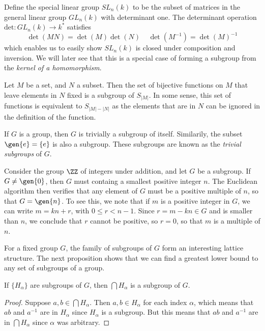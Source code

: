 \begin{example}
    Define the special linear group $SL_n(k)$ to be the subset of matrices in the general linear group $GL_n(k)$ with determinant one. The determinant operation $\text{det}: GL_n(k) \to k^*$ satisfies
    \[ \det(MN) = \det(M) \det(N)\ \ \ \ \ \det(M^{-1}) = \det(M)^{-1} \]
    which enables us to easily show $SL_n(k)$ is closed under composition and inversion. We will later see that this is a special case of forming a subgroup from the {\it kernel of a homomorphism}.
\end{example}

\begin{example}
    Let $M$ be a set, and $N$ a subset. Then the set of bijective functions on $M$ that leave elements in $N$ fixed is a subgroup of $S_{|M|}$. In some sense, this set of functions is equivalent to $S_{|M| - |N|}$ as the elements that are in $N$ can be ignored in the definition of the function.
\end{example}

\begin{example}
    If $G$ is a group, then $G$ is trivially a subgroup of itself. Similarily, the subset $\gen{e} = \{ e \}$ is also a subgroup. These subgroups are known as the \emph{trivial subgroups} of $G$.
\end{example}

\begin{example}
    Consider the group $\ZZ$ of integers under addition, and let $G$ be a subgroup. If $G \neq \gen{0}$, then $G$ must containg a smallest positive integer $n$. The Euclidean algorithm then verifies that any element of $G$ must be a positive multiple of $n$, so that $G = \gen{n}$. To see this, we note that if $m$ is a positive integer in $G$, we can write $m = kn + r$, with $0 \leq r < n-1$. Since $r = m - kn \in G$ and is smaller than $n$, we conclude that $r$ cannot be positive, so $r = 0$, so that $m$ is a multiple of $n$.
\end{example}

For a fixed group $G$, the family of subgroups of $G$ form an interesting lattice structure. The next proposition shows that we can find a greatest lower bound to any set of subgroups of a group.

\begin{prop}
    If $\{ H_\alpha \}$ are subgroups of $G$, then $\bigcap H_\alpha$ is a subgroup of $G$.
\end{prop}
\begin{proof}
    Suppose $a,b \in \bigcap H_\alpha$. Then $a,b \in H_\alpha$ for each index $\alpha$, which means that $ab$ and $a^{-1}$ are in $H_\alpha$ since $H_\alpha$ is a subgroup. But this means that $ab$ and $a^{-1}$ are in $\bigcap H_\alpha$ since $\alpha$ was arbitrary.
\end{proof}

